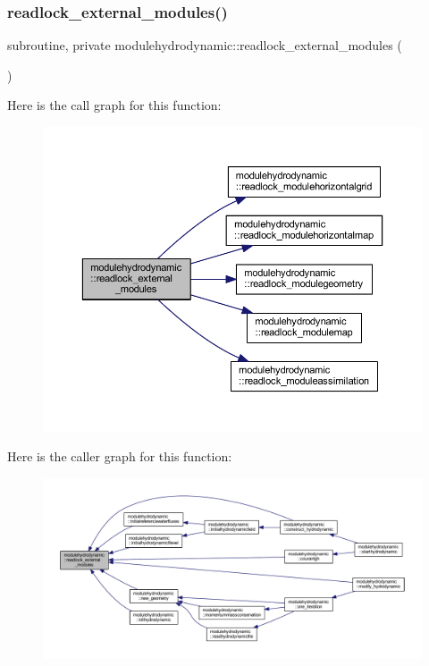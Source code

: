 \subsubsection{\texorpdfstring{readlock\+\_\+external\+\_\+modules()}{readlock\_external\_modules()}}
{\footnotesize\ttfamily subroutine, private modulehydrodynamic\+::readlock\+\_\+external\+\_\+modules (\begin{DoxyParamCaption}{ }\end{DoxyParamCaption})\hspace{0.3cm}{\ttfamily [private]}}

Here is the call graph for this function\+:\nopagebreak
\begin{figure}[H]
\begin{center}
\leavevmode
\includegraphics[width=350pt]{namespacemodulehydrodynamic_a52fe0c61446c7eca188bf5a42867951b_cgraph}
\end{center}
\end{figure}
Here is the caller graph for this function\+:\nopagebreak
\begin{figure}[H]
\begin{center}
\leavevmode
\includegraphics[width=350pt]{namespacemodulehydrodynamic_a52fe0c61446c7eca188bf5a42867951b_icgraph}
\end{center}
\end{figure}
\mbox{\label{namespacemodulehydrodynamic_ab5bfdd9c743fefaf135fd907892e5f17}} 
